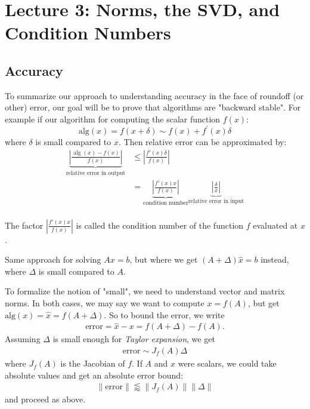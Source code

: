\documentclass[11pt]{article}
\numberwithin{equation}{section}
\begin{document}
\newpage
\section{Lecture 3: Norms, the SVD, and Condition Numbers}
\subsection{Accuracy}
To summarize our approach to understanding accuracy in the face of roundoff (or other) error, our goal will be to prove that algorithms are "backward stable". 
For example if our algorithm for computing the scalar function $f(x)$:
$$\mathrm{alg}(x)=f(x+\delta) \sim f(x) + f^\prime(x)\delta$$
where $\delta$ is small compared to $x$. Then relative error can be approximated by:
\begin{align*}
    \underbrace{\left| \frac{\operatorname{alg}(x) - f(x)}{f(x)} \right|}_{\text{relative \ error\ in\ output}} &\leq  \left| \frac{f'(x) \delta}{f(x)} \right| \\ 
    &= \underbrace{\left| \frac{f'(x) x}{f(x)} \right|}_{\text{condition number}} \underbrace{\left|\frac{\delta}{x} \right|}_{\text{relative\ error\ in\ input}} \\
\end{align*}

\begin{definition}
    The factor $\left| \frac{f'(x) x}{f(x)} \right|$ is called the condition number of the function $f$ evaluated at $x$.
\end{definition}
Same approach for solving $Ax=b$, but where we get $(A+\Delta)\hat{x}=b$ instead, where $\Delta$ is small compared to $A$. 

To formalize the notion of "small", we need to understand vector and matrix norms. In both cases, we may say we want to compute $x=f(A)$, 
but get $\mathrm{alg}(x)=\hat{x}=f(A+\Delta)$. So to bound the error, we write \begin{align*}
    \mathrm{error}=\hat{x}-x=f(A+\Delta)-f(A).
\end{align*}
Assuming $\Delta$ is small enough for \textit{Taylor expansion}, we get \begin{align*}
    \mathrm{error} \sim J_f(A)\Delta
\end{align*}
where $J_f(A)$ is the Jacobian of $f$. If $A$ and $x$ were scalars, we could take absolute values and get an absolute error bound: \begin{align*}
    \|\mathrm{error}\| \lessapprox \|J_f(A)\| \|\Delta\|
\end{align*}
and proceed as above.
\end{document}
